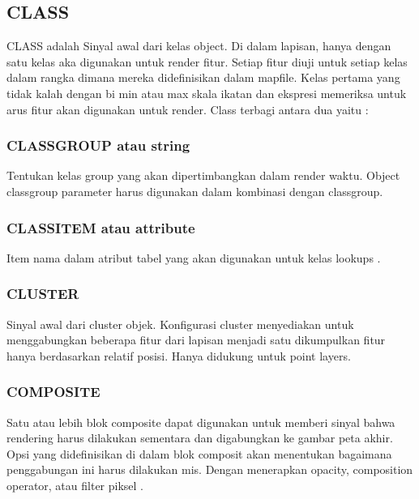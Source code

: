 \subsection{CLASS}
CLASS adalah Sinyal awal dari kelas object. Di dalam lapisan, hanya dengan satu kelas aka digunakan untuk render fitur.  
Setiap fitur diuji untuk setiap kelas dalam rangka dimana mereka didefinisikan dalam mapfile.  
Kelas pertama yang tidak kalah dengan bi min atau max skala ikatan dan ekspresi memeriksa untuk arus fitur akan digunakan untuk render.  
Class terbagi antara dua yaitu :

  \subsubsection{CLASSGROUP atau string}
  Tentukan kelas group yang akan dipertimbangkan dalam render waktu. Object classgroup parameter harus digunakan dalam kombinasi dengan classgroup.
  \subsubsection{CLASSITEM atau attribute}
  Item nama dalam atribut tabel yang akan digunakan untuk kelas lookups .
  \subsubsection{CLUSTER}
  Sinyal awal dari cluster objek. Konfigurasi cluster menyediakan untuk menggabungkan beberapa fitur dari lapisan menjadi satu   dikumpulkan   fitur  hanya berdasarkan relatif posisi. Hanya didukung untuk point layers.
  \subsubsection{COMPOSITE}
  Satu atau lebih blok composite dapat digunakan untuk memberi sinyal bahwa rendering harus dilakukan sementara dan digabungkan ke gambar peta akhir. 
  Opsi yang didefinisikan di dalam blok composit akan menentukan bagaimana penggabungan ini harus dilakukan  mis. Dengan menerapkan opacity, composition operator, atau filter piksel .
  

